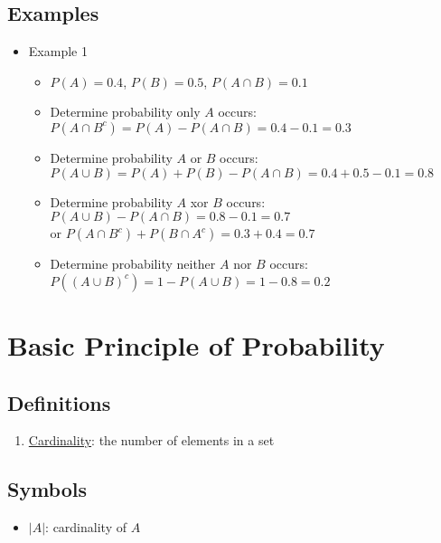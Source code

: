 \documentclass[12pt]{article}
\begin{document}
        \subsection{Examples}
            \begin{itemize}
                \item Example 1
                \begin{itemize}
                    \item $P(A) = 0.4$, $P(B) = 0.5$, $P(A \cap B) = 0.1$
                    \item Determine probability only $A$ occurs:
                    \\$P(A \cap B^c) = P(A) - P(A \cap B) = 0.4 - 0.1 = 0.3$
                    \item Determine probability $A$ or $B$ occurs:
                    \\$P(A \cup B) = P(A) + P(B) - P(A \cap B) = 0.4 + 0.5 - 0.1 = 0.8$
                    \item Determine probability $A$ xor $B$ occurs:
                    \\$P(A \cup B) - P(A \cap B) = 0.8 - 0.1 = 0.7$
                    \\or $P(A \cap B^c) + P(B \cap A^c) = 0.3 + 0.4 = 0.7$
                    \item Determine probability neither $A$ nor $B$ occurs:
                    \\$P((A \cup B)^c) = 1 - P(A \cup B) = 1 - 0.8 = 0.2$
                \end{itemize}
            \end{itemize}
    \section{Basic Principle of Probability}
        \subsection{Definitions}
            \begin{enumerate}
                \item \underline{Cardinality}: the number of elements in a set
            \end{enumerate}
        \subsection{Symbols}
            \begin{itemize}
                \item $|A|$: cardinality of $A$
            \end{itemize}
\end{document}
